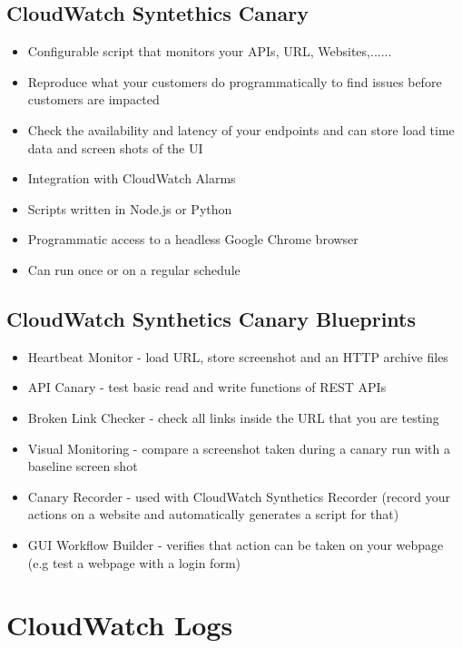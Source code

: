 \subsection{CloudWatch Syntethics Canary}
\begin{itemize}
    \item Configurable script that monitors your APIs, URL, Websites,......
    \item Reproduce what your customers do programmatically to find issues before customers are impacted
    \item Check the availability and latency of your endpoints and can store load time data and screen shots of the UI
    \item Integration with CloudWatch Alarms
    \item Scripts written in Node.js or Python
    \item Programmatic access to a headless Google Chrome browser
    \item Can run once or on a regular schedule
\end{itemize}

\subsection{CloudWatch Synthetics Canary Blueprints}
\begin{itemize}
    \item Heartbeat Monitor - load URL, store screenshot and an HTTP archive files
    \item API Canary - test basic read and write functions of REST APIs
    \item Broken Link Checker - check all links inside the URL that you are testing
    \item Visual Monitoring - compare a screenshot taken during a canary run with a baseline screen shot
    \item Canary Recorder - used with CloudWatch Synthetics Recorder (record your actions on a website and automatically generates a script for that)
    \item GUI Workflow Builder - verifies that action can be taken on your webpage (e.g test a webpage with a login form)
\end{itemize}


\section{CloudWatch Logs}

